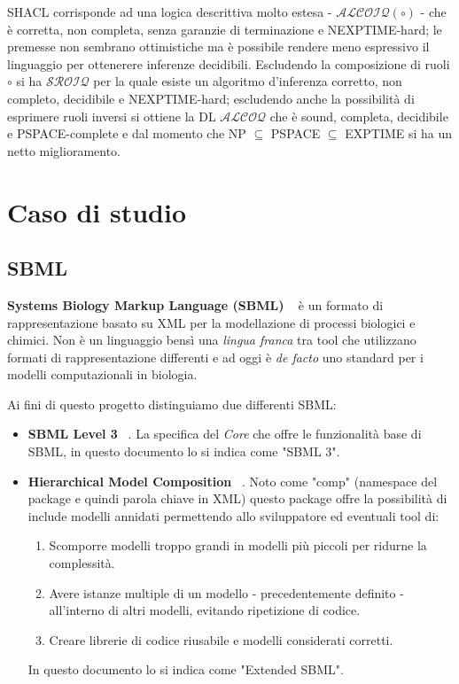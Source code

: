 \documentclass{article}
\begin{document}
SHACL corrisponde ad una logica descrittiva molto estesa - $\mathcal{ALCOIQ(\circ)}$ - che è corretta, non completa, senza garanzie di terminazione e NEXPTIME-hard; le premesse non sembrano ottimistiche ma è possibile rendere meno espressivo il linguaggio per ottenerere inferenze decidibili. Escludendo la composizione di ruoli $\circ$ si ha $\mathcal{SROIQ}$ per la quale esiste un algoritmo d'inferenza corretto, non completo, decidibile e NEXPTIME-hard; escludendo anche la possibilità di esprimere ruoli inversi si ottiene la DL $\mathcal{ALCOQ}$ che è sound, completa, decidibile e PSPACE-complete e dal momento che NP $\subseteq$ PSPACE $\subseteq$ EXPTIME si ha un netto miglioramento. 

\clearpage
\section{Caso di studio}

\subsection{SBML}
\textbf{Systems Biology Markup Language (SBML)} ~\cite{sbml} è un formato di rappresentazione basato su XML per la modellazione di processi biologici e chimici. Non è un linguaggio bensì una \textit{lingua franca} tra tool che utilizzano formati di rappresentazione differenti e ad oggi è \textit{de facto} uno standard per i modelli computazionali in biologia. 

Ai fini di questo progetto distinguiamo due differenti SBML:
\begin{itemize}
    \item \textbf{SBML Level 3} ~\cite{sbml:core}. La specifica del \textit{Core} che offre le funzionalità base di SBML, in questo documento lo si indica come "SBML 3".
    \item \textbf{Hierarchical Model Composition} ~\cite{sbml:hierarcical}. Noto come "comp" (namespace del package e quindi parola chiave in XML) questo package offre la possibilità di include modelli annidati permettendo allo sviluppatore ed eventuali tool di:
    \begin{enumerate}
        \item Scomporre modelli troppo grandi in modelli più piccoli per ridurne la complessità.
        \item Avere istanze multiple di un modello - precedentemente definito - all'interno di altri modelli, evitando ripetizione di codice. 
        \item Creare librerie di codice riusabile e modelli considerati corretti. 
    \end{enumerate}
    In questo documento lo si indica come "Extended SBML". 
\end{itemize}
\end{document}
